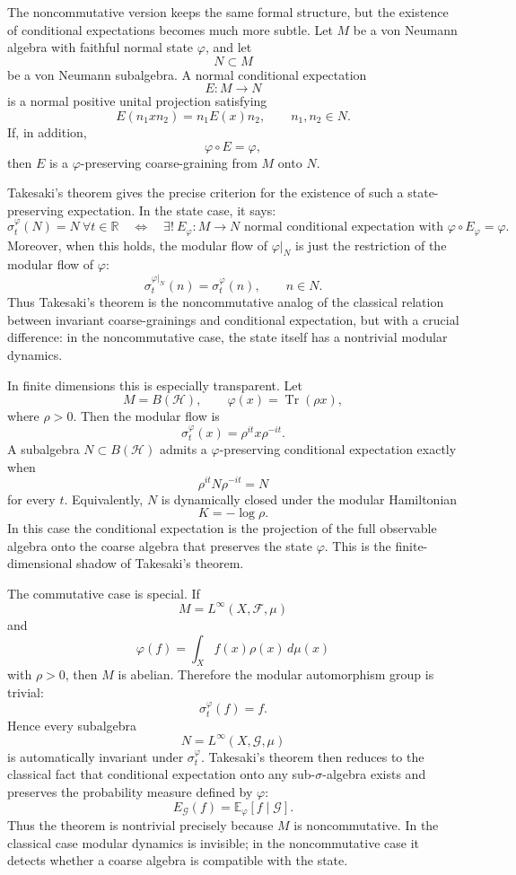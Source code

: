 \documentclass[a4paper,11pt]{article}
\theoremstyle{definition}
\begin{document}
The noncommutative version keeps the same formal structure, but the existence of conditional expectations becomes much more subtle. Let \(M\) be a von Neumann algebra with faithful normal state \(\varphi\), and let
\[
N\subset M
\]
be a von Neumann subalgebra. A normal conditional expectation
\[
E:M\to N
\]
is a normal positive unital projection satisfying
\[
E(n_1 x n_2)=n_1E(x)n_2,
\qquad n_1,n_2\in N.
\]
If, in addition,
\[
\varphi\circ E=\varphi,
\]
then \(E\) is a \(\varphi\)-preserving coarse-graining from \(M\) onto \(N\).

Takesaki's theorem gives the precise criterion for the existence of such a state-preserving expectation. In the state case, it says:
\[
\boxed{
\sigma_t^\varphi(N)=N\ \forall t\in\mathbb R
\quad\Longleftrightarrow\quad
\exists!\ E_\varphi:M\to N
\text{ normal conditional expectation with }
\varphi\circ E_\varphi=\varphi.
}
\]
Moreover, when this holds, the modular flow of \(\varphi|_N\) is just the restriction of the modular flow of \(\varphi\):
\[
\sigma_t^{\varphi|_N}(n)=\sigma_t^\varphi(n),
\qquad n\in N.
\]
Thus Takesaki's theorem is the noncommutative analog of the classical relation between invariant coarse-grainings and conditional expectation, but with a crucial difference: in the noncommutative case, the state itself has a nontrivial modular dynamics.

In finite dimensions this is especially transparent. Let
\[
M=B(\mathcal H),
\qquad
\varphi(x)=\operatorname{Tr}(\rho x),
\]
where \(\rho>0\). Then the modular flow is
\[
\sigma_t^\varphi(x)=\rho^{it}x\rho^{-it}.
\]
A subalgebra \(N\subset B(\mathcal H)\) admits a \(\varphi\)-preserving conditional expectation exactly when
\[
\rho^{it}N\rho^{-it}=N
\]
for every \(t\). Equivalently, \(N\) is dynamically closed under the modular Hamiltonian
\[
K=-\log\rho.
\]
In this case the conditional expectation is the projection of the full observable algebra onto the coarse algebra that preserves the state \(\varphi\). This is the finite-dimensional shadow of Takesaki's theorem.

The commutative case is special. If
\[
M=L^\infty(X,\mathcal F,\mu)
\]
and
\[
\varphi(f)=\int_X f(x)\rho(x)\,d\mu(x)
\]
with \(\rho>0\), then \(M\) is abelian. Therefore the modular automorphism group is trivial:
\[
\sigma_t^\varphi(f)=f.
\]
Hence every subalgebra
\[
N=L^\infty(X,\mathcal G,\mu)
\]
is automatically invariant under \(\sigma_t^\varphi\). Takesaki's theorem then reduces to the classical fact that conditional expectation onto any sub-\(\sigma\)-algebra exists and preserves the probability measure defined by \(\varphi\):
\[
E_{\mathcal G}(f)=\mathbb E_\varphi[f\mid \mathcal G].
\]
Thus the theorem is nontrivial precisely because \(M\) is noncommutative. In the classical case modular dynamics is invisible; in the noncommutative case it detects whether a coarse algebra is compatible with the state.
\end{document}
